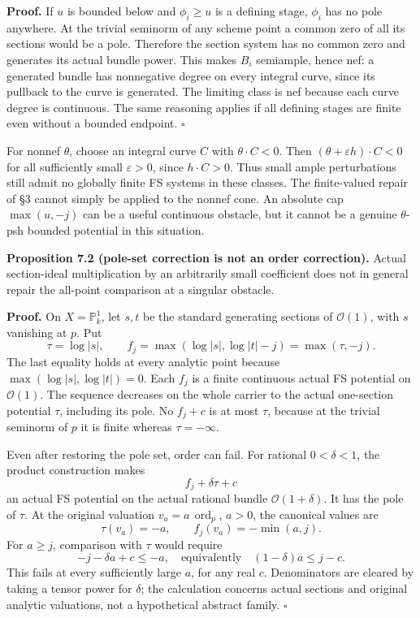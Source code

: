 \documentclass[10pt]{article}
\begin{document}
\textbf{Proof.} If \(u\) is bounded below and \(\phi_i\geq u\) is a
defining stage, \(\phi_i\) has no pole anywhere. At the trivial seminorm
of any scheme point a common zero of all its sections would be a pole.
Therefore the section system has no common zero and generates its actual
bundle power. This makes \(B_i\) semiample, hence nef: a generated
bundle has nonnegative degree on every integral curve, since its
pullback to the curve is generated. The limiting class is nef because
each curve degree is continuous. The same reasoning applies if all
defining stages are finite even without a bounded endpoint. \(\square\)

For nonnef \(\theta\), choose an integral curve \(C\) with
\(\theta\cdot C<0\). Then \((\theta+\varepsilon h)\cdot C<0\) for all
sufficiently small \(\varepsilon>0\), since \(h\cdot C>0\). Thus small
ample perturbations still admit no globally finite FS systems in these
classes. The finite-valued repair of §3 cannot simply be applied to the
nonnef cone. An absolute cap \(\max(u,-j)\) can be a useful continuous
obstacle, but it cannot be a genuine \(\theta\)-psh bounded potential in
this situation.

\textbf{Proposition 7.2 (pole-set correction is not an order
correction).} Actual section-ideal multiplication by an arbitrarily
small coefficient does not in general repair the all-point comparison at
a singular obstacle.

\textbf{Proof.} On \(X=\mathbb P^1_k\), let \(s,t\) be the standard
generating sections of \(\mathcal O(1)\), with \(s\) vanishing at \(p\).
Put \[
 \tau=\log|s|,\qquad
 f_j=\max(\log|s|,\log|t|-j)=\max(\tau,-j).
 \tag{7.1}
\] The last equality holds at every analytic point because
\(\max(\log|s|,\log|t|)=0\). Each \(f_j\) is a finite continuous actual
FS potential on \(\mathcal O(1)\). The sequence decreases on the whole
carrier to the actual one-section potential \(\tau\), including its
pole. No \(f_j+c\) is at most \(\tau\), because at the trivial seminorm
of \(p\) it is finite whereas \(\tau=-\infty\).

Even after restoring the pole set, order can fail. For rational
\(0<\delta<1\), the product construction makes \[
 f_j+\delta\tau+c
\] an actual FS potential on the actual rational bundle
\(\mathcal O(1+\delta)\). It has the pole of \(\tau\). At the original
valuation \(v_a=a\,\operatorname{ord}_p\), \(a>0\), the canonical values
are \[
 \tau(v_a)=-a,\qquad f_j(v_a)=-\min(a,j).
\] For \(a\geq j\), comparison with \(\tau\) would require \[
 -j-\delta a+c\leq-a,
 \quad\text{equivalently}\quad (1-\delta)a\leq j-c.
 \tag{7.2}
\] This fails at every sufficiently large \(a\), for any real \(c\).
Denominators are cleared by taking a tensor power for \(\delta\); the
calculation concerns actual sections and original analytic valuations,
not a hypothetical abstract family. \(\square\)
\end{document}
